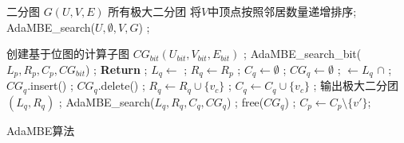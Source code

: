 






\begin{algorithm} [H]
  \begin{algorithmic}[1]
    \normalsize

    \REQUIRE 二分图 $G(U,V,E)$
    \ENSURE 所有极大二分团
    \STATE 将$V$中顶点按照邻居数量递增排序;
    \STATE \textsf{AdaMBE\_search}($U, \emptyset, V, G$) ;
     
    \renewcommand{\algorithmicwhile}{\textbf{procedure}}
    \renewcommand{\algorithmicdo}{\textbf{:}}
    

        \STATE 创建基于位图的计算子图 $CG_{bit} (U_{bit}, V_{bit}, E_{bit})$ ;
        \STATE \textsf{AdaMBE\_search\_bit}($L_p, R_p, C_p, CG_{bit}$) ;
        \STATE \textbf{Return} ;
      \ENDIF
        \STATE $L_q \leftarrow$  ; $R_q\leftarrow R_p$ ; $C_q \leftarrow \emptyset$ ; $CG_q \leftarrow \emptyset$ ;
          \STATE {} $\leftarrow L_q$ $\cap$  ;
          \STATE $CG_q$\textsf{.insert}() ;
            \STATE $CG_q$\textsf{.delete}() ;
          \ENDIF
            \STATE $R_q \leftarrow R_q \cup \{v_c\}$ ;
            \STATE $C_q \leftarrow C_q \cup \{v_c\}$ ;
          \ENDIF
        \ENDFOR
          \STATE 输出极大二分团 $(L_q, R_q)$ ;
          \STATE \textsf{AdaMBE\_search}($L_q, R_q, C_q, CG_q$) ;
        \ENDIF
        \STATE \textsf{free}($CG_q$) ; $C_p \leftarrow C_p \setminus \{v'\} $;
      \ENDFOR
    \ENDWHILE 

  \end{algorithmic}
  \caption{AdaMBE算法}
  \label{alg:adambe}
\end{algorithm}




